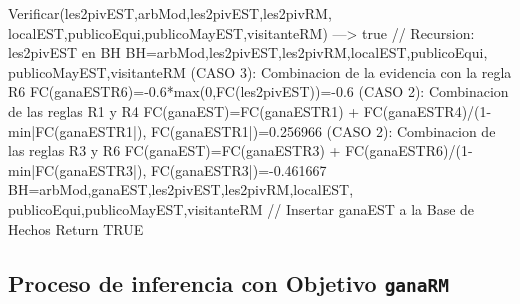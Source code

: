 \begin{listing}[language=Pascal]
	Verificar(les2pivEST,{arbMod,les2pivEST,les2pivRM, localEST,publicoEqui,publicoMayEST,visitanteRM}) ---> true // Recursion: les2pivEST en BH
	BH={arbMod,les2pivEST,les2pivRM,localEST,publicoEqui, publicoMayEST,visitanteRM}
	(CASO 3): Combinacion de la evidencia con la regla R6
	 FC(ganaEST{R6})=-0.6*max(0,FC(les2pivEST))=-0.6
	(CASO 2): Combinacion de las reglas R1 y R4
	 FC(ganaEST)=FC(ganaEST{R1}) + FC(ganaEST{R4})/(1-min{|FC(ganaEST{R1}|), FC(ganaEST{R1}|})=0.256966
	(CASO 2): Combinacion de las reglas R3 y R6
	 FC(ganaEST)=FC(ganaEST{R3}) + FC(ganaEST{R6})/(1-min{|FC(ganaEST{R3}|), FC(ganaEST{R3}|})=-0.461667
	BH={arbMod,ganaEST,les2pivEST,les2pivRM,localEST, publicoEqui,publicoMayEST,visitanteRM} // Insertar ganaEST a la Base de Hechos
Return TRUE
\end{listing}
\subsection{Proceso de inferencia con Objetivo \texttt{ganaRM}}
